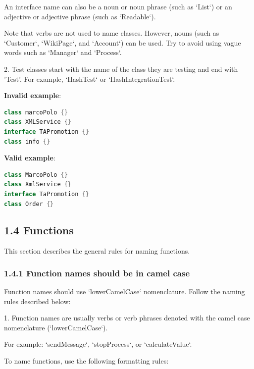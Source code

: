 An interface name can also be a noun or noun phrase (such as `List`) or an adjective or adjective phrase (such as `Readable`).

Note that verbs are not used to name classes. However, nouns (such as `Customer`, `WikiPage`, and `Account`) can be used. Try to avoid using vague words such as `Manager` and `Process`.



2.	Test classes start with the name of the class they are testing and end with 'Test'. For example, `HashTest` or `HashIntegrationTest`.



\textbf{Invalid example}: 

\begin{lstlisting}[language=Kotlin]
class marcoPolo {} 
class XMLService {} 
interface TAPromotion {}
class info {}
\end{lstlisting}


\textbf{Valid example}: 

\begin{lstlisting}[language=Kotlin]
class MarcoPolo {}
class XmlService {}
interface TaPromotion {}
class Order {}
\end{lstlisting}


\subsection*{\textbf{1.4 Functions}}

\label{sec:1.4}

This section describes the general rules for naming functions.

\subsubsection*{\textbf{1.4.1 Function names should be in camel case}}
\leavevmode\newline

\label{sec:1.4.1}

Function names should use `lowerCamelCase` nomenclature. Follow the naming rules described below:

1.	Function names are usually verbs or verb phrases denoted with the camel case nomenclature (`lowerCamelCase`).

For example: `sendMessage`, `stopProcess`, or `calculateValue`.

To name functions, use the following formatting rules:



